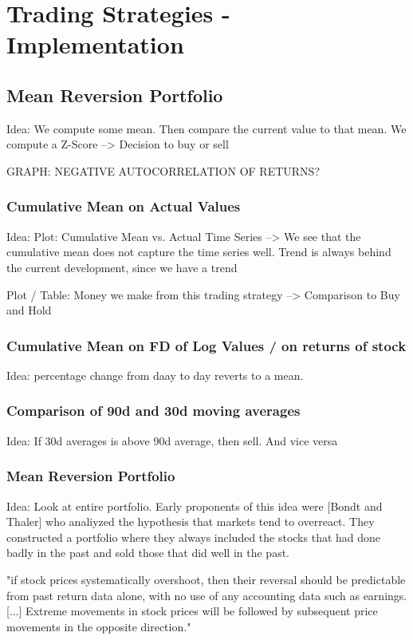\section{Trading Strategies - Implementation}
\subsection{Mean Reversion Portfolio}

Idea: We compute some mean. Then compare the current value to that mean. We compute a Z-Score --> Decision to buy or sell




GRAPH: NEGATIVE AUTOCORRELATION OF RETURNS?





\subsubsection{Cumulative Mean on Actual Values}
Idea: 
Plot: Cumulative Mean vs. Actual Time Series
--> We see that the cumulative mean does not capture the time series well. Trend is always behind the current development, since we have a trend

Plot / Table: Money we make from this trading strategy --> Comparison to Buy and Hold

\subsubsection{Cumulative Mean on FD of Log Values / on returns of stock}
Idea: percentage change from daay to day reverts to a mean. 


\subsubsection{Comparison of 90d and 30d moving averages}
Idea: If 30d averages is above 90d average, then sell. And vice versa

\subsubsection{Mean Reversion Portfolio}
Idea: Look at entire portfolio. 
Early proponents of this idea were [Bondt and Thaler] who analiyzed the hypothesis that markets tend to overreact. They constructed a portfolio where they always included the stocks that had done badly in the past and sold those that did well in the past. 

"if stock prices systematically overshoot, then their reversal should be predictable from past return data alone, with no use of any accounting data such as earnings. [...] Extreme movements in stock prices will be followed by subsequent price movements in the opposite direction."

